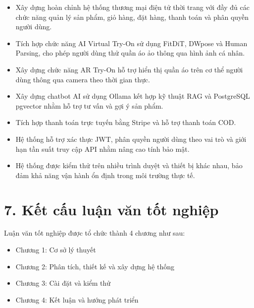 \begin{itemize}
    \item Xây dựng hoàn chỉnh hệ thống thương mại điện tử thời trang với đầy đủ các chức năng quản lý sản phẩm, giỏ hàng, đặt hàng, thanh toán và phân quyền người dùng.
    
    \item Tích hợp chức năng AI Virtual Try-On sử dụng FitDiT, DWpose và Human Parsing, cho phép người dùng thử quần áo ảo thông qua hình ảnh cá nhân.
    
    \item Xây dựng chức năng AR Try-On hỗ trợ hiển thị quần áo trên cơ thể người dùng thông qua camera theo thời gian thực.
    
    \item Xây dựng chatbot AI sử dụng Ollama kết hợp kỹ thuật RAG và PostgreSQL pgvector nhằm hỗ trợ tư vấn và gợi ý sản phẩm.
    
    \item Tích hợp thanh toán trực tuyến bằng Stripe và hỗ trợ thanh toán COD.
    
    \item Hệ thống hỗ trợ xác thực JWT, phân quyền người dùng theo vai trò và giới hạn tần suất truy cập API nhằm nâng cao tính bảo mật.
    
    \item Hệ thống được kiểm thử trên nhiều trình duyệt và thiết bị khác nhau, bảo đảm khả năng vận hành ổn định trong môi trường thực tế.
\end{itemize}

\section*{7. Kết cấu luận văn tốt nghiệp}

Luận văn tốt nghiệp được tổ chức thành 4 chương như sau:

\begin{itemize}
    \item Chương 1: Cơ sở lý thuyết
    \item Chương 2: Phân tích, thiết kế và xây dựng hệ thống
    \item Chương 3: Cài đặt và kiểm thử
    \item Chương 4: Kết luận và hướng phát triển
\end{itemize}


\clearpage